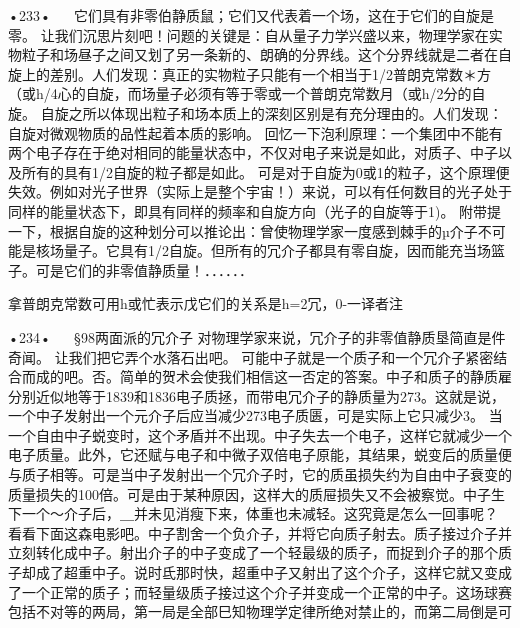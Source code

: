 •233•
  
它们具有非零伯静质鼠；它们又代表着一个场，这在于它们的自旋是零。
让我们沉思片刻吧！问题的关键是：自从量子力学兴盛以来，物理学家在实物粒子和场昼子之间又划了另一条新的、朗确的分界线。这个分界线就是二者在自旋上的差别。人们发现：真正的实物粒子只能有一个相当于1/2普朗克常数＊方（或h/4心的自旋，而场量子必须有等于零或一个普朗克常数月（或h/2分的自旋。
自旋之所以体现出粒子和场本质上的深刻区别是有充分理由的。人们发现：自旋对微观物质的品性起着本质的影响。
回忆一下泡利原理：一个集团中不能有两个电子存在于绝对相同的能量状态中，不仅对电子来说是如此，对质子、中子以及所有的具有1/2自旋的粒子都是如此。
可是对于自旋为0或1的粒子，这个原理便失效。例如对光子世界（实际上是整个宇宙！）来说，可以有任何数目的光子处于同样的能量状态下，即具有同样的频率和自旋方向（光子的自旋等于1)。
附带提一下，根据自旋的这种划分可以推论出：曾使物理学家一度感到棘手的µ介子不可能是核场量子。它具有1/2自旋。但所有的冗介子都具有零自旋，因而能充当场篮子。可是它们的非零值静质量！．．．．．．

拿普朗克常数可用h或忙表示戊它们的关系是h=2冗，0-一译者注

•234•
  
§98两面派的冗介子
对物理学家来说，冗介子的非零值静质垦简直是件奇闻。
让我们把它弄个水落石出吧。
可能中子就是一个质子和一个冗介子紧密结合而成的吧。否。简单的贺术会使我们相信这一否定的答案。中子和质子的静质雇分别近似地等于1839和1836电子质拯，而带电冗介子的静质量为273。这就是说，一个中子发射出一个元介子后应当减少273电子质匮，可是实际上它只减少3。
当一个自由中子蜕变时，这个矛盾并不出现。中子失去一个电子，这样它就减少一个电子质量。此外，它还赋与电子和中微子双倍电子原能，其结果，蜕变后的质量便与质子相等。可是当中子发射出一个冗介子时，它的质虽损失约为自由中子衰变的质量损失的100倍。可是由于某种原因，这样大的质屉损失又不会被察觉。中子生下一个～介子后，＿并未见消瘦下来，体重也未减轻。这究竟是怎么一回事呢？
看看下面这森电影吧。中子割舍一个负介子，并将它向质子射去。质子接过介子并立刻转化成中子。射出介子的中子变成了一个轻最级的质子，而捉到介子的那个质子却成了超重中子。说时氐那时快，超重中子又射出了这个介子，这样它就又变成了一个正常的质子；而轻量级质子接过这个介子并变成一个正常的中子。这场球赛包括不对等的两局，第一局是全部巳知物理学定律所绝对禁止的，而第二局倒是可

